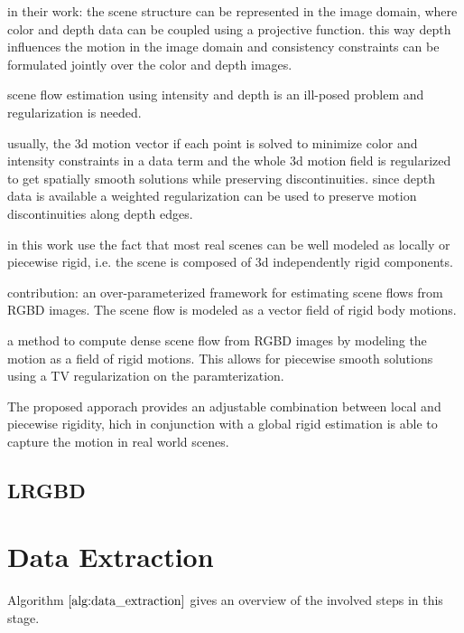 in their work: the scene structure can be represented in the image domain, where color and depth data can be coupled using a projective function. this way depth influences the motion in the image domain and consistency constraints can be formulated jointly over the color and depth images.

scene flow estimation using intensity and depth is an ill-posed problem and regularization is needed.

usually, the 3d motion vector if each point is solved to minimize color and intensity constraints in a data term and the whole 3d motion field is regularized to get spatially smooth solutions while preserving discontinuities. since depth data is available a weighted regularization can be used to preserve motion discontinuities along depth edges. 

in this work use the fact that most real scenes can be well modeled as locally or piecewise rigid, i.e. the scene is composed of 3d independently rigid components. 

contribution: an over-parameterized framework for estimating scene flows from RGBD images. The scene flow is modeled as a vector field of rigid body motions. 

a method to compute dense scene flow from RGBD images by modeling the motion as a field of rigid motions. This allows for piecewise smooth solutions using a TV regularization on the paramterization. 

The proposed apporach provides an adjustable combination between local and piecewise rigidity, hich in conjunction with a global rigid estimation is able to capture the motion in real world scenes.

\subsection{LRGBD}

\section{Data Extraction}


Algorithm $\ref{alg:data_extraction}$ gives an overview of the involved steps in this stage.

